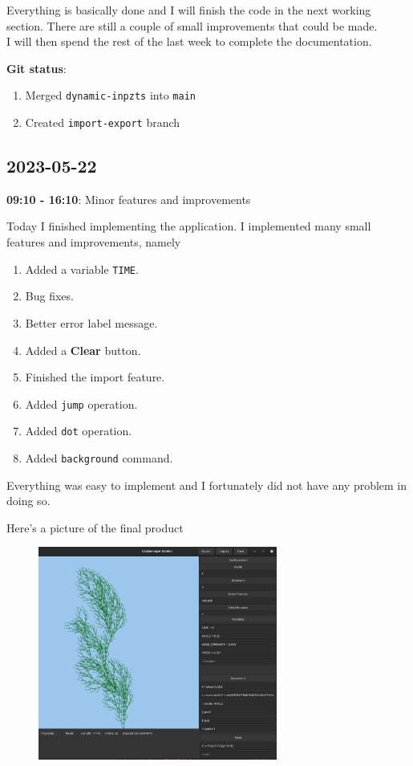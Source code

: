 \documentclass{article}
\begin{document}
Everything is basically done and I will finish the code in the next
working section. There are still a couple of small improvements
that could be made. \\
I will then spend the rest of the last week to complete the documentation.

\textbf{Git status}:
\begin{enumerate}
    \item Merged \texttt{dynamic-inpzts} into \texttt{main}
    \item Created \texttt{import-export} branch
\end{enumerate}

\subsection{2023-05-22}

\textbf{09:10 - 16:10}: Minor features and improvements

Today I finished implementing the application.
I implemented many small features and improvements, namely
\begin{enumerate}
    \item Added a variable \texttt{TIME}.
    \item Bug fixes.
    \item Better error label message.
    \item Added a \textbf{Clear} button.
    \item Finished the import feature.
    \item Added \texttt{jump} operation.
    \item Added \texttt{dot} operation.
    \item Added \texttt{background} command.
\end{enumerate}

Everything was easy to implement and
I fortunately did not have any problem in doing so.

Here's a picture of the final product
\begin{center}
    \begin{figure}[h]
        \includegraphics[width=0.7\textwidth]{final.png}
    \end{figure}
\end{center}
\end{document}
